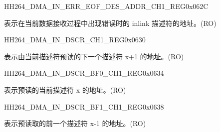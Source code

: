 \begin{register}{H}{H264\_DMA\_IN\_ERR\_EOF\_DES\_ADDR\_CH1\_REG}{0x062C}\label{regdesc:H264DMAINERREOFDESADDRCH1REG}
%
\regnewline%
\begin{regdesc}\begin{reglist}
\label{fielddesc:H264DMAINERREOFDESADDRCH1}\item [H264\_DMA\_IN\_ERR\_EOF\_DES\_ADDR\_CH1] 表示在当前数据接收过程中出现错误时的 inlink 描述符的地址。(RO)
\end{reglist}\end{regdesc}
\end{register}


\begin{register}{H}{H264\_DMA\_IN\_DSCR\_CH1\_REG}{0x0630}\label{regdesc:H264DMAINDSCRCH1REG}
%
\regnewline%
\begin{regdesc}\begin{reglist}
\label{fielddesc:H264DMAINLINKDSCRCH1}\item [H264\_DMA\_INLINK\_DSCR\_CH1] 表示由当前描述符预读的下一个描述符 x+1 的地址。(RO)
\end{reglist}\end{regdesc}
\end{register}


\begin{register}{H}{H264\_DMA\_IN\_DSCR\_BF0\_CH1\_REG}{0x0634}\label{regdesc:H264DMAINDSCRBF0CH1REG}
%
\regnewline%
\begin{regdesc}\begin{reglist}
\label{fielddesc:H264DMAINLINKDSCRBF0CH1}\item [H264\_DMA\_INLINK\_DSCR\_BF0\_CH1] 表示预读的当前描述符 x 的地址。(RO)
\end{reglist}\end{regdesc}
\end{register}


\begin{register}{H}{H264\_DMA\_IN\_DSCR\_BF1\_CH1\_REG}{0x0638}\label{regdesc:H264DMAINDSCRBF1CH1REG}
%
\regnewline%
\begin{regdesc}\begin{reglist}
\label{fielddesc:H264DMAINLINKDSCRBF1CH1}\item [H264\_DMA\_INLINK\_DSCR\_BF1\_CH1] 表示预读取的前一个描述符 x-1 的地址。(RO)
\end{reglist}\end{regdesc}
\end{register}

